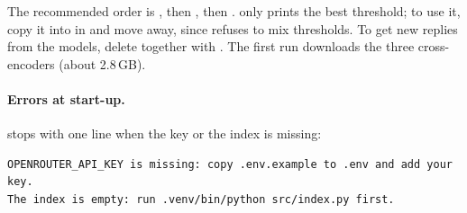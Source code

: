 The recommended order is , then , then . 
only prints the best threshold; to use it, copy it into  in  and
move  away, since  refuses to mix thresholds. To get new replies
from the models, delete  together with .
The first  run downloads the three cross-encoders (about 2.8\,GB).

\paragraph{Errors at start-up.}
 stops with one line when the key or the index is missing:
\begin{lstlisting}
OPENROUTER_API_KEY is missing: copy .env.example to .env and add your key.
The index is empty: run .venv/bin/python src/index.py first.
\end{lstlisting}
